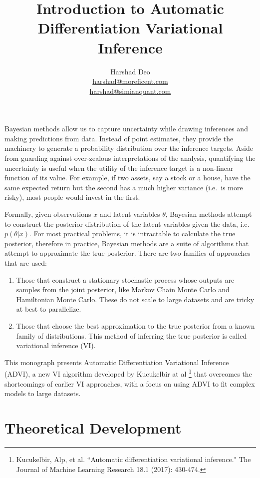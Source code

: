 \documentclass[10pt]{article}
\title{Introduction to Automatic Differentiation Variational Inference}
\author{Harshad Deo \\ 
  \href{mailto:harshad@moreficent.com}{harshad@moreficent.com} \\ 
  \href{mailto:harshad@simianquant.com}{harshad@simianquant.com}
}
\date{}
\begin{document}
  
\maketitle

Bayesian methods allow us to capture uncertainty while drawing inferences and making predictions from data. Instead of 
point estimates, they provide the machinery to generate a probability distribution over the inference targets. Aside from 
guarding against over-zealous interpretations of the analysis, quantifying the uncertainty is useful when the utility of 
the inference target is a non-linear function of its value. For example, if two assets, say a stock or a house, have the
same expected return but the second has a much higher variance (i.e.\ is more risky), most people would invest in the 
first. 

Formally, given observations $x$ and latent variables $\theta$, Bayesian methods attempt to construct the posterior 
distribution of the latent variables given the data, i.e.\ $p(\theta|x)$. For most practical problems, it is intractable 
to calculate the true posterior, therefore in practice, Bayesian methods are a suite of algorithms that attempt to 
approximate the true posterior. There are two families of approaches that are used:

\begin{enumerate}
  \item Those that construct a stationary stochastic process whose outputs are samples from the joint posterior, like 
    Markov Chain Monte Carlo and Hamiltonian Monte Carlo. These do not scale to large datasets and are tricky at 
    best to parallelize.
  \item Those that choose the best approximation to the true posterior from a known family of distributions. This method 
    of inferring the true posterior is called variational inference (VI).
\end{enumerate}

This monograph presents Automatic Differentiation Variational Inference (ADVI), a new VI algorithm
developed by Kucukelbir at al \footnote{Kucukelbir, Alp, et al. ``Automatic differentiation variational inference." 
The Journal of Machine Learning Research 18.1 (2017): 430-474.} that overcomes the shortcomings of earlier VI approaches,
with a focus on using ADVI to fit complex models to large datasets. 

\section*{Theoretical Development}
\end{document}

